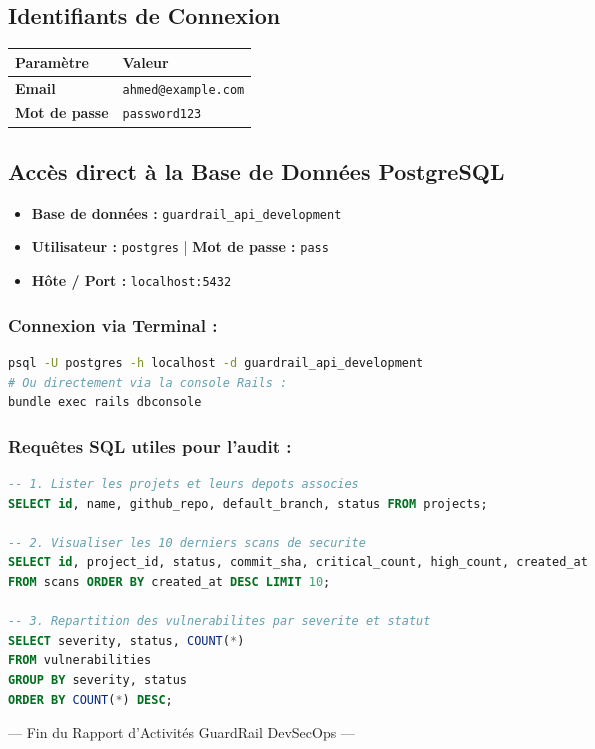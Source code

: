 \documentclass[11pt,a4paper]{article}
\begin{document}
\vspace{3mm}

\subsection{Identifiants de Connexion}
\begin{table}[H]
\centering
\begin{tabular}{ll}
\toprule
\textbf{Paramètre} & \textbf{Valeur} \\
\midrule
\textbf{Email} & \texttt{ahmed@example.com} \\
\textbf{Mot de passe} & \texttt{password123} \\
\bottomrule
\end{tabular}
\end{table}

\vspace{3mm}

\subsection{Accès direct à la Base de Données PostgreSQL}
\begin{itemize}
    \item \textbf{Base de données :} \texttt{guardrail\_api\_development}
    \item \textbf{Utilisateur :} \texttt{postgres} \quad | \quad \textbf{Mot de passe :} \texttt{pass}
    \item \textbf{Hôte / Port :} \texttt{localhost:5432}
\end{itemize}

\subsubsection{Connexion via Terminal :}
\begin{lstlisting}[language=bash]
psql -U postgres -h localhost -d guardrail_api_development
# Ou directement via la console Rails :
bundle exec rails dbconsole
\end{lstlisting}

\subsubsection{Requêtes SQL utiles pour l'audit :}
\begin{lstlisting}[language=SQL]
-- 1. Lister les projets et leurs depots associes
SELECT id, name, github_repo, default_branch, status FROM projects;

-- 2. Visualiser les 10 derniers scans de securite
SELECT id, project_id, status, commit_sha, critical_count, high_count, created_at 
FROM scans ORDER BY created_at DESC LIMIT 10;

-- 3. Repartition des vulnerabilites par severite et statut
SELECT severity, status, COUNT(*) 
FROM vulnerabilities 
GROUP BY severity, status 
ORDER BY COUNT(*) DESC;
\end{lstlisting}

\vspace{5mm}
\begin{center}
    \small \color{gray} --- Fin du Rapport d'Activités GuardRail DevSecOps ---
\end{center}
\end{document}
